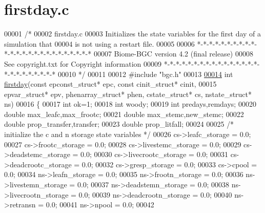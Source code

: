 \hypertarget{firstday_8c_source}{}\section{firstday.\+c}
\label{firstday_8c_source}

\begin{DoxyCode}
00001 \textcolor{comment}{/* }
00002 \textcolor{comment}{firstday.c}
00003 \textcolor{comment}{Initializes the state variables for the first day of a simulation that}
00004 \textcolor{comment}{is not using a restart file.}
00005 \textcolor{comment}{}
00006 \textcolor{comment}{*-*-*-*-*-*-*-*-*-*-*-*-*-*-*-*-*-*-*-*-*-*-*-*-*}
00007 \textcolor{comment}{Biome-BGC version 4.2 (final release)}
00008 \textcolor{comment}{See copyright.txt for Copyright information}
00009 \textcolor{comment}{*-*-*-*-*-*-*-*-*-*-*-*-*-*-*-*-*-*-*-*-*-*-*-*-*}
00010 \textcolor{comment}{*/}
00011 
00012 \textcolor{preprocessor}{#include "bgc.h"}
00013 
\hypertarget{firstday_8c_source_l00014}{}\hyperlink{firstday_8c_abb6c5cdd7fcae478726423f980f8a3b6}{00014} \textcolor{keywordtype}{int} \hyperlink{firstday_8c_abb6c5cdd7fcae478726423f980f8a3b6}{firstday}(\textcolor{keyword}{const} epconst\_struct* epc, \textcolor{keyword}{const} cinit\_struct* cinit,
00015 epvar\_struct* epv, phenarray\_struct* phen, cstate\_struct* cs, nstate\_struct* ns)
00016 \{
00017     \textcolor{keywordtype}{int} ok=1;
00018     \textcolor{keywordtype}{int} woody;
00019     \textcolor{keywordtype}{int} predays,remdays;
00020     \textcolor{keywordtype}{double} max\_leafc,max\_frootc;
00021     \textcolor{keywordtype}{double} max\_stemc,new\_stemc;
00022     \textcolor{keywordtype}{double} prop\_transfer,transfer;
00023     \textcolor{keywordtype}{double} prop\_litfall;
00024     
00025     \textcolor{comment}{/* initialize the c and n storage state variables */}
00026     cs->leafc\_storage = 0.0;
00027     cs->frootc\_storage = 0.0;
00028     cs->livestemc\_storage = 0.0;
00029     cs->deadstemc\_storage = 0.0;
00030     cs->livecrootc\_storage = 0.0;
00031     cs->deadcrootc\_storage = 0.0;
00032     cs->gresp\_storage = 0.0;
00033     cs->cpool = 0.0;
00034     ns->leafn\_storage = 0.0;
00035     ns->frootn\_storage = 0.0;
00036     ns->livestemn\_storage = 0.0;
00037     ns->deadstemn\_storage = 0.0;
00038     ns->livecrootn\_storage = 0.0;
00039     ns->deadcrootn\_storage = 0.0;
00040     ns->retransn = 0.0;
00041     ns->npool = 0.0;
00042     

\end{DoxyCode}
